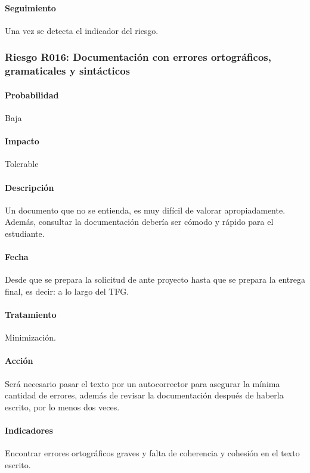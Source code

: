 \documentclass[10pt,a4paper]{article}
\begin{document}
				\paragraph{Seguimiento}	Una vez se detecta el indicador del riesgo. %
			
			\subsubsection{Riesgo R016: Documentación con errores ortográficos, gramaticales y sintácticos}
				\paragraph{Probabilidad} Baja
				\paragraph{Impacto}	Tolerable
				\paragraph{Descripción} Un documento que no se entienda, es muy difícil de valorar apropiadamente. Además, consultar la documentación debería ser cómodo y rápido para el estudiante. 
				\paragraph{Fecha} Desde que se prepara la solicitud de ante proyecto hasta que se prepara la entrega final, es decir: a lo largo del TFG.  %
				\paragraph{Tratamiento} Minimización.%
				\paragraph{Acción} Será necesario pasar el texto por un autocorrector para asegurar la mínima cantidad de errores, además de revisar la documentación después de haberla escrito, por lo menos dos veces. %
				\paragraph{Indicadores} Encontrar errores ortográficos graves y falta de coherencia y cohesión en el texto escrito. %
				
\end{document}

